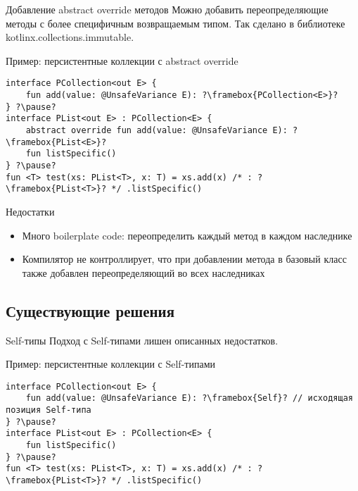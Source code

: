 \documentclass[handout,aspectratio=169,usenames,dvipsnames]{beamer}
\begin{document}
    \begin{frame}[fragile]{Добавление abstract override методов}
        Можно добавить переопределяющие методы с более специфичным возвращаемым типом.
        Так сделано в библиотеке kotlinx.collections.immutable.
        \pause
        \begin{block}{Пример: персистентные коллекции с abstract override}
            \begin{verbatim}
interface PCollection<out E> {
    fun add(value: @UnsafeVariance E): ?\framebox{PCollection<E>}?
} ?\pause?
interface PList<out E> : PCollection<E> {
    abstract override fun add(value: @UnsafeVariance E): ?\framebox{PList<E>}?
    fun listSpecific()
} ?\pause?
fun <T> test(xs: PList<T>, x: T) = xs.add(x) /* : ?\framebox{PList<T>}? */ .listSpecific()
            \end{verbatim}
        \end{block}
        \pause
        \begin{block}{Недостатки}
            \begin{itemize}
                \item Много boilerplate code: переопределить каждый метод в каждом наследнике
                \item Компилятор не контроллирует, что при добавлении метода в базовый класс также добавлен переопределяющий во всех наследниках
            \end{itemize}
        \end{block}
    \end{frame}

    \subsection{Существующие решения}

    \begin{frame}[fragile]{Self-типы}
        Подход с Self-типами лишен описанных недостатков.
        \begin{block}{Пример: персистентные коллекции с Self-типами}
            \begin{verbatim}
interface PCollection<out E> {
    fun add(value: @UnsafeVariance E): ?\framebox{Self}? // исходящая позиция Self-типа
} ?\pause?
interface PList<out E> : PCollection<E> {
    fun listSpecific()
} ?\pause?
fun <T> test(xs: PList<T>, x: T) = xs.add(x) /* : ?\framebox{PList<T>}? */ .listSpecific()
            \end{verbatim}
        \end{block}
    \end{frame}
\end{document}
